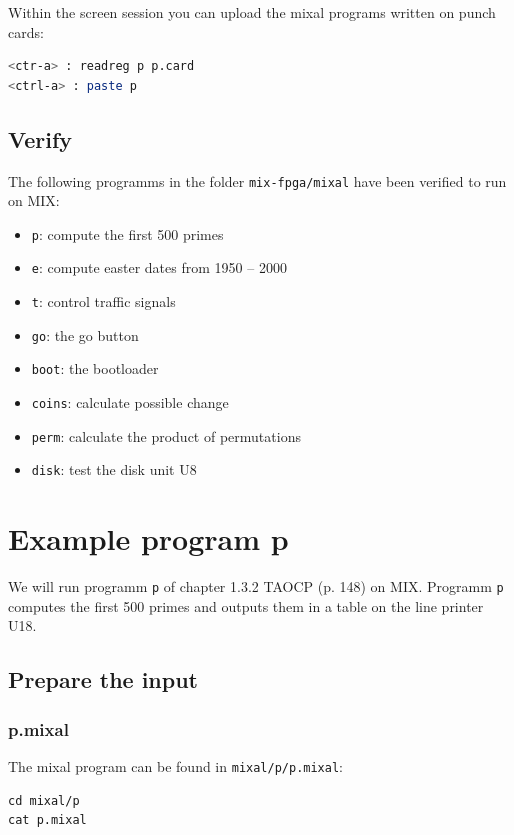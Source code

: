 \documentclass[a4paper,ngerman]{scrartcl}
\begin{document}
Within  the screen session you can upload the mixal programs written on punch cards:
\begin{lstlisting}[language=bash,numbers=none,frame=none]
<ctr-a> : readreg p p.card
<ctrl-a> : paste p
\end{lstlisting}


\subsection{Verify}
The following programms in the folder \lstinline|mix-fpga/mixal| have been verified to run on MIX:
\begin{itemize}
	\item \lstinline|p|: compute the first 500 primes
	\item \lstinline|e|: compute easter dates from 1950 -- 2000
	\item  \lstinline|t|: control traffic signals
	\item  \lstinline|go|: the go button
	\item \lstinline|boot|: the bootloader
	\item \lstinline|coins|: calculate possible change
	\item \lstinline|perm|: calculate the product of permutations
	\item \lstinline|disk|: test the disk unit U8
\end{itemize}

\section{Example program p}
We will run programm \lstinline|p| of chapter 1.3.2 TAOCP (p. 148) on MIX. Programm \lstinline|p| computes the first 500 primes and outputs them in a table on the line printer U18.
\subsection{Prepare the input}
\subsubsection{p.mixal}
The mixal program can be found in \lstinline|mixal/p/p.mixal|:

\begin{lstlisting}[numbers=none,frame=none]
cd mixal/p
cat p.mixal
\end{lstlisting}


\end{document}
